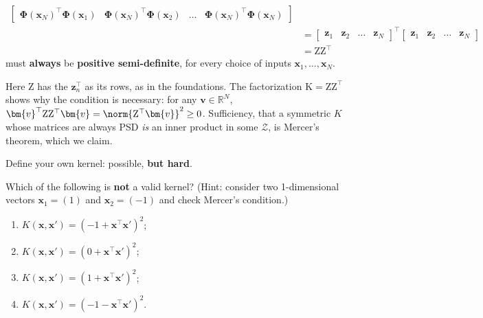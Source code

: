 \begin{itemize}
\begin{itemize}
\[\begin{aligned}
\begin{bmatrix}
                            \bm{\Phi}(\bm{x}_N)^\top \bm{\Phi}(\bm{x}_1) &
                            \bm{\Phi}(\bm{x}_N)^\top \bm{\Phi}(\bm{x}_2) &
                            \dots & \bm{\Phi}(\bm{x}_N)^\top
                            \bm{\Phi}(\bm{x}_N)
                        \end{bmatrix}\\
                        &= \begin{bmatrix} \bm{z}_1 & \bm{z}_2 & \dots &
                            \bm{z}_N \end{bmatrix}^\top \begin{bmatrix}
                            \bm{z}_1 & \bm{z}_2 & \dots & \bm{z}_N
                            \end{bmatrix}\\
                        &= \mathrm{Z} \mathrm{Z}^\top
                    \end{aligned}
                \]
                must \textbf{always} be \textbf{positive semi-definite}, for
                every choice of inputs \(\bm{x}_1, \dots , \bm{x}_N\).
        \end{itemize}
\end{itemize}

Here \(\mathrm{Z}\) has the \(\bm{z}_n^\top\) as its rows, as in the
foundations. The factorization \(\mathrm{K} = \mathrm{Z} \mathrm{Z}^\top\)
shows why the condition is necessary: for any \(\bm{v} \in \mathbb{R}^N\),
\(\bm{v}^\top \mathrm{Z} \mathrm{Z}^\top \bm{v} = \norm{\mathrm{Z}^\top
\bm{v}}^2 \ge 0\). Sufficiency, that a symmetric \(K\) whose matrices are
always PSD \emph{is} an inner product in some \(\mathcal{Z}\), is Mercer's
theorem, which we claim.

\begin{moral}
    Define your own kernel: possible, \textbf{but hard}.
\end{moral}

\begin{exercise}
    Which of the following is \textbf{not} a valid kernel? (Hint: consider
    two 1-dimensional vectors \(\bm{x}_1 = (1)\) and \(\bm{x}_2 = (-1)\) and
    check Mercer's condition.)
    \begin{enumerate}[(1)]
        \item \(K(\bm{x}, \bm{x}') = (-1 + \bm{x}^\top \bm{x}')^2\);
        \item \(K(\bm{x}, \bm{x}') = (0 + \bm{x}^\top \bm{x}')^2\);
        \item \(K(\bm{x}, \bm{x}') = (1 + \bm{x}^\top \bm{x}')^2\);
        \item \(K(\bm{x}, \bm{x}') = (-1 - \bm{x}^\top \bm{x}')^2\).
    \end{enumerate}
\end{exercise}

